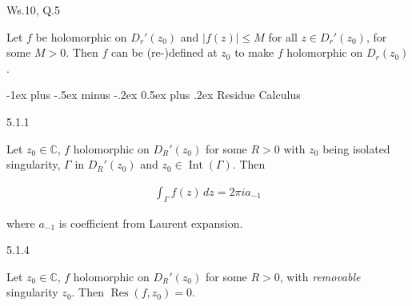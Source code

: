 \documentclass[10pt,landscape]{article}
\makeatletter
\renewcommand{\leq}{\leqslant}
\DeclareMathOperator{\Int}{Int}
\DeclareMathOperator{\Res}{Res}
\renewcommand{\section}{\@startsection{section}{1}{0mm}%
                                {-1ex plus -.5ex minus -.2ex}%
                                {0.5ex plus .2ex}%
                                {\normalfont\large\bfseries}}
\makeatother
\begin{document}
\begin{multicols}{3}
%
%
%
%
%

\begin{question}{Ws.10, Q.5}{}

    Let $f$ be holomorphic on $D_r'(z_0)$ and $|f(z)| \leq M$ for all $z \in D_r'(z_0)$, for some $M > 0$. Then $f$ can be (re-)defined at $z_0$ to make $f$ holomorphic on $D_r(z_0)$.

\end{question}


\section{Residue Calculus}

\begin{theorem}{5.1.1}{}

    Let $z_0 \in \mathbb{C}$, $f$ holomorphic on $D_R'(z_0)$ for some $R > 0$ with $z_0$ being isolated singularity, $\Gamma$ in $D_R'(z_0)$ and $z_0 \in \Int\!{(\Gamma)}$. Then

        \begin{align*}
            \int_{\Gamma} f(z) \,dz = 2\pi i a_{-1}
        \end{align*}

    where $a_{-1}$ is coefficient from Laurent expansion.

\end{theorem}

\begin{lemma}{5.1.4}{}

    Let $z_0 \in \mathbb{C}$, $f$ holomorphic on $D_R'(z_0)$ for some $R > 0$, with \emph{removable} singularity $z_0$. Then $\Res\!{(f,z_0)} = 0$.


\end{lemma}
\end{multicols}
\end{document}

